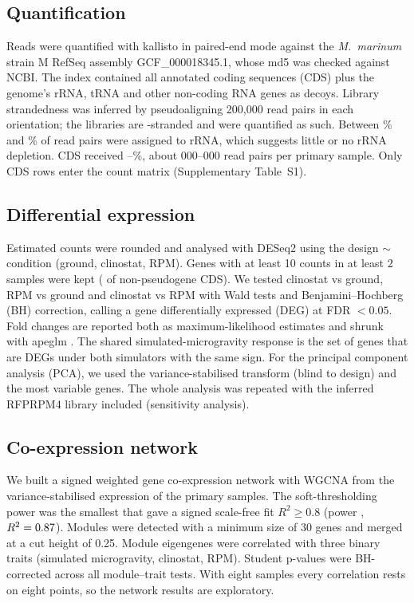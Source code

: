 \subsection*{Quantification}
Reads were quantified with kallisto \kallistoVersion{}\cite{bray2016near} in paired-end mode against the \textit{M.~marinum} strain M RefSeq assembly GCF\_000018345.1\cite{stinear2008insights}, whose md5 was checked against NCBI. The index contained all \nCdsIndex{} annotated coding sequences (CDS) plus the genome's \nNcrnaDecoys{} rRNA, tRNA and other non-coding RNA genes as decoys. Library strandedness was inferred by pseudoaligning 200{,}000 read pairs in each orientation; the libraries are \strandedness{}-stranded and were quantified as such. Between \pctRrnaMin{}\% and \pctRrnaMax{}\% of read pairs were assigned to rRNA, which suggests little or no rRNA depletion. CDS received \pctCdsMin{}--\pctCdsMax{}\%, about \cdsPairsPrimaryMinK{}{,}000--\cdsPairsPrimaryMaxK{}{,}000 read pairs per primary sample. Only CDS rows enter the count matrix (Supplementary Table~S1).

\subsection*{Differential expression}
Estimated counts were rounded and analysed with DESeq2 \deseqVersion{}\cite{love2014moderated} using the design $\sim$\,condition (ground, clinostat, RPM). Genes with at least 10 counts in at least 2 samples were kept (\nGenesTested{} of \nGenesInput{} non-pseudogene CDS). We tested clinostat vs ground, RPM vs ground and clinostat vs RPM with Wald tests and Benjamini--Hochberg (BH) correction, calling a gene differentially expressed (DEG) at FDR $<0.05$. Fold changes are reported both as maximum-likelihood estimates and shrunk with apeglm \apeglmVersion{}\cite{zhu2019heavy}. The shared simulated-microgravity response is the set of genes that are DEGs under both simulators with the same sign. For the principal component analysis (PCA), we used the variance-stabilised transform (blind to design) and the \pcaGenes{} most variable genes. The whole analysis was repeated with the inferred RFPRPM4 library included (sensitivity analysis).

\subsection*{Co-expression network}
We built a signed weighted gene co-expression network with WGCNA \wgcnaVersion{}\cite{langfelder2008wgcna} from the variance-stabilised expression of the \nPrimary{} primary samples. The soft-thresholding power was the smallest that gave a signed scale-free fit $R^2\ge0.8$ (power \wgcnaPower{}, $R^2=0.87$). Modules were detected with a minimum size of 30 genes and merged at a cut height of 0.25. Module eigengenes were correlated with three binary traits (simulated microgravity, clinostat, RPM). Student p-values were BH-corrected across all \nModuleTraitTests{} module--trait tests. With eight samples every correlation rests on eight points, so the network results are exploratory.

